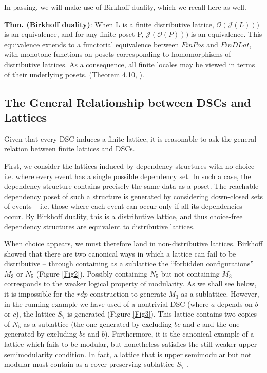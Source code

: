 \documentclass[a4paper,USenglish,cleveref, autoref, thm-restate,authorcolumns]{lipics-v2019}
\newcommand{\Oc}{\mathcal{O}}
\newcommand{\Jc}{\mathcal{J}}
\begin{document}
In passing, we will make use of Birkhoff duality, which we recall here as well.

\textbf{Thm. (Birkhoff duality)}: When L is a finite distributive lattice, \(\Oc(\Jc(L)))\) is an equivalence, and for any finite poset P,  \(\Jc(\Oc(P)))\) is an equivalence. This equivalence extends to a functorial equivalence between \(FinPos\) and \(FinDLat\), with monotone functions on posets corresponding to homomorphisms of distributive lattices. As a consequence, all finite locales may be viewed in terms of their underlying posets. (Theorem 4.10, \cite{davey2002introduction}).


\subsection{The General Relationship between DSCs and Lattices}
Given that every DSC induces a finite lattice, it is reasonable to ask the general relation between finite lattices and DSCs. 

First, we consider the lattices induced by dependency structures with no choice -- i.e. where every event has a single possible dependency set. In such a case, the dependency structure contains precisely the same data as a poset. The reachable dependency poset of such a structure is generated by considering down-closed sets of events -- i.e. those where each event can occur only if all its dependencies occur. By Birkhoff duality, this is a distributive lattice, and thus choice-free dependency structures are equivalent to distributive lattices.

When choice appears, we must therefore land in non-distributive lattices. Birkhoff showed that there are two canonical ways in which a lattice can fail to be distributive -- through containing as a sublattice the ``forbidden configurations'' \(M_3\) or \(N_5\) (Figure \ref{Fig2}). Possibly containing \(N_5\) but not containing \(M_3\) corresponds to the weaker logical property of modularity. As we shall see below, it is impossible for the \(rdp\) construction to generate \(M_3\) as a sublattice. However, in the running example we have used of a nontrivial DSC (where \(a\) depends on \(b\) or \(c\)), the lattice \(S_7\) is generated (Figure \ref{Fig3}). This lattice contains two copies of \(N_5\) as a sublattice (the one generated by excluding \(bc\) and \(c\) and the one generated by excluding \(bc\) and \(b\)). Furthermore, it is the canonical example of a lattice which fails to be modular, but nonetheless satisfies the still weaker upper semimodularity condition. In fact, a lattice that is upper semimodular but not modular must contain as a cover-preserving sublattice \(S_7\)  \cite{stern1999semimodular}. 
\end{document}
